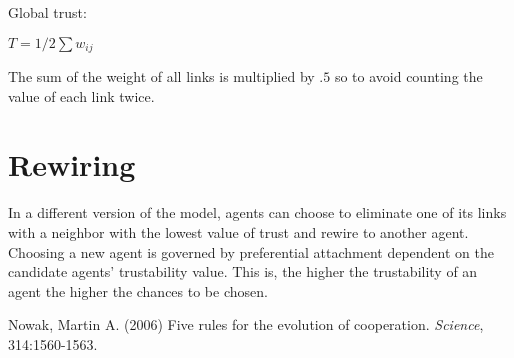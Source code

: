 \documentclass[11pt]{article} \usepackage{amsmath}
\begin{document}
Global trust:

$T = 1/2 \sum w_{ij}$

The sum of the weight of all links is multiplied by $.5$ so to avoid counting the value of each link twice.\\

\section{Rewiring}

In a different version of the model, agents can choose to eliminate
one of its links with a neighbor with the lowest value of trust and
rewire to another agent. Choosing a new agent is governed by
preferential attachment dependent on the candidate agents'
trustability value. This is, the higher the trustability of an agent
the higher the chances to be chosen.

\begin{thebibliography}{30}

 Nowak, Martin A. (2006) Five rules for the
  evolution of cooperation. \textit{Science}, 314:1560-1563.

\end{thebibliography}
\end{document}

